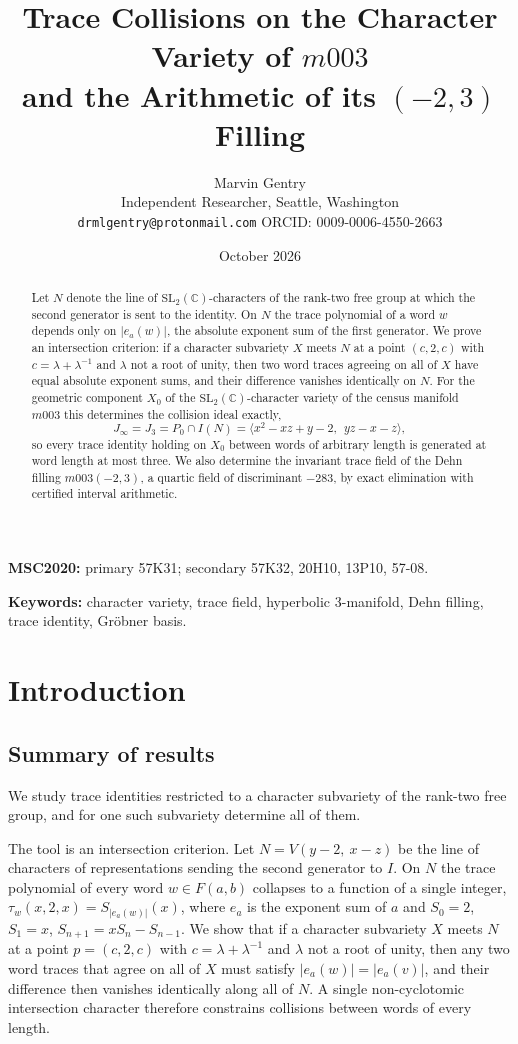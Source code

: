 \documentclass[11pt,a4paper]{article}
\title{Trace Collisions on the Character Variety of $m003$\\
and the Arithmetic of its $(-2,3)$ Filling}
\author{Marvin Gentry\\
\small Independent Researcher, Seattle, Washington\\
\small \texttt{drmlgentry@protonmail.com} \quad ORCID: 0009-0006-4550-2663}
\date{October 2026}
\theoremstyle{definition}
\theoremstyle{remark}
\newcommand{\SLtwo}{\mathrm{SL}_2(\mathbb{C})}
\newcommand{\mscline}{%
  \textbf{MSC2020:} primary 57K31; secondary 57K32, 20H10, 13P10, 57-08.}
\newcommand{\keywordline}{%
  \textbf{Keywords:} character variety, trace field, hyperbolic
  3-manifold, Dehn filling, trace identity, Gr\"obner basis.}
\begin{document}
\maketitle

\begin{abstract}
Let $N$ denote the line of $\SLtwo$-characters of the rank-two free group
at which the second generator is sent to the identity. On $N$ the trace
polynomial of a word $w$ depends only on $|e_a(w)|$, the absolute exponent
sum of the first generator. We prove an intersection criterion: if a
character subvariety $X$ meets $N$ at a point $(c,2,c)$ with
$c=\lambda+\lambda^{-1}$ and $\lambda$ not a root of unity, then two word
traces agreeing on all of $X$ have equal absolute exponent sums, and their
difference vanishes identically on $N$. For the geometric component $X_0$
of the $\SLtwo$-character variety of the census manifold $m003$ this
determines the collision ideal exactly,
\[
J_\infty = J_3 = P_0\cap I(N) = \langle x^2-xz+y-2,\ \ yz-x-z\rangle ,
\]
so every trace identity holding on $X_0$ between words of arbitrary length
is generated at word length at most three. We also determine the invariant
trace field of the Dehn filling $m003(-2,3)$, a quartic field of
discriminant $-283$, by exact elimination with certified interval
arithmetic.
\end{abstract}

\medskip
\noindent\mscline

\noindent\keywordline

\tableofcontents

\section{Introduction}

\subsection{Summary of results}

We study trace identities restricted to a character subvariety of the
rank-two free group, and for one such subvariety determine all of them.

The tool is an intersection criterion. Let $N = V(y-2,\ x-z)$ be the line
of characters of representations sending the second generator to $I$. On
$N$ the trace polynomial of every word $w \in F(a,b)$ collapses to a
function of a single integer,
$\tau_w(x,2,x) = S_{|e_a(w)|}(x)$,
where $e_a$ is the exponent sum of $a$ and $S_0 = 2$, $S_1 = x$,
$S_{n+1} = xS_n - S_{n-1}$. We show that if a character subvariety $X$
meets $N$ at a point $p = (c,2,c)$ with $c = \lambda + \lambda^{-1}$ and
$\lambda$ not a root of unity, then any two word traces that agree on
all of $X$ must satisfy $|e_a(w)| = |e_a(v)|$, and their difference then
vanishes identically along all of $N$. A single non-cyclotomic intersection
character therefore constrains collisions between words of every length.
\end{document}
